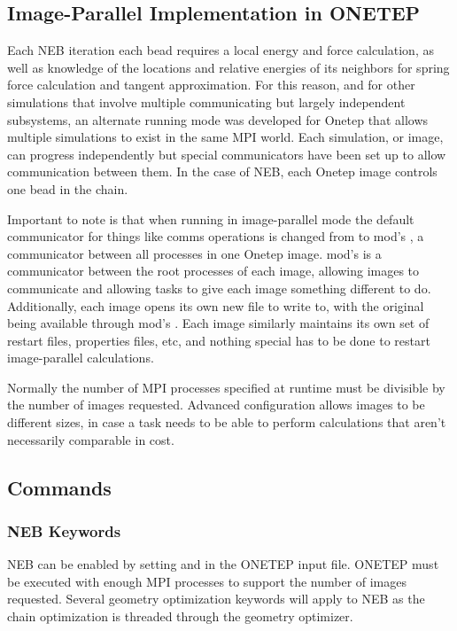 \documentclass[letterpaper,10pt,english]{sphinxmanual}
\begin{document}
\subsection{Image-Parallel Implementation in ONETEP}
\label{\detokenize{nudged-elastic-band:image-parallel-implementation-in-onetep}}
Each NEB iteration each bead requires a local energy and force
calculation, as well as knowledge of the locations and relative energies
of its neighbors for spring force calculation and tangent approximation.
For this reason, and for other simulations that involve multiple
communicating but largely independent subsystems, an alternate running
mode was developed for Onetep that allows multiple simulations to exist
in the same MPI world. Each simulation, or image, can progress
independently but special communicators have been set up to allow
communication between them. In the case of NEB, each Onetep image
controls one bead in the chain.

Important to note is that when running in image-parallel mode the
default communicator for things like comms operations is changed from
 to  mod’s , a communicator
between all processes in one Onetep image.  mod’s
 is a communicator between the root processes of
each image, allowing images to communicate and allowing tasks to give
each image something different to do. Additionally, each image opens its
own new file  to write  to,
with the original  being available through 
mod’s . Each image similarly maintains its own set of
restart files, properties files, etc, and nothing special has to be done
to restart image-parallel calculations.

Normally the number of MPI processes specified at runtime must be
divisible by the number of images requested. Advanced configuration
allows images to be different sizes, in case a task needs to be able to
perform calculations that aren’t necessarily comparable in cost.


\subsection{Commands}
\label{\detokenize{nudged-elastic-band:commands}}

\subsubsection{NEB Keywords}
\label{\detokenize{nudged-elastic-band:neb-keywords}}
NEB can be enabled by setting  and
 in the ONETEP input file. ONETEP must be
executed with enough MPI processes to support the number of images
requested. Several geometry optimization keywords will apply to NEB as
the chain optimization is threaded through the geometry optimizer.
\end{document}
